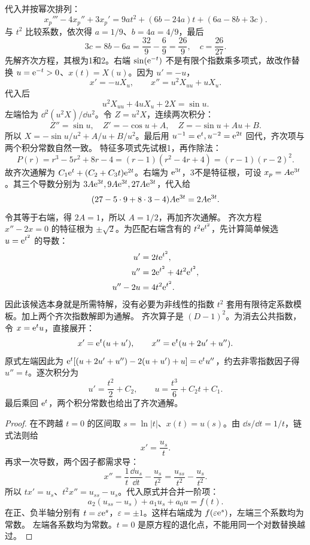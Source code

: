 代入并按幂次排列：
\[
x_p'''-4x_p''+3x_p'
=9at^2+(6b-24a)t+(6a-8b+3c).
\]
与 $t^2$ 比较系数，依次得 $a=1/9$、$b=4a=4/9$，最后
\[
3c=8b-6a=\dfrac{32}{9}-\dfrac{6}{9}=\dfrac{26}{9},
\quad c=\dfrac{26}{27}.
\]
先解齐次方程，其根为1和2。右端 $\sin(\mathrm e^{-t})$ 不是有限个指数乘多项式，故改作替换 $u=\mathrm e^{-t}>0$、$x(t)=X(u)$。因为 $u'=-u$，
\[
x'=-uX_u,\qquad x''=u^2X_{uu}+uX_u.
\]
代入后
\[
u^2X_{uu}+4uX_u+2X=\sin u.
\]
左端恰为 $\dd^2(u^2X)/\dd u^2$。令 $Z=u^2X$，连续两次积分：
\[
Z''=\sin u,\quad Z'=-\cos u+A,\quad Z=-\sin u+Au+B.
\]
所以 $X=-\sin u/u^2+A/u+B/u^2$。最后用 $u^{-1}=\mathrm e^t,u^{-2}=\mathrm e^{2t}$ 回代，齐次项与两个积分常数自然一致。
特征多项式先试根1，再作除法：
\[
P(r)=r^3-5r^2+8r-4=(r-1)(r^2-4r+4)=(r-1)(r-2)^2.
\]
故齐次通解为 $C_1\mathrm e^t+(C_2+C_3t)\mathrm e^{2t}$。右端为 $\mathrm e^{3t}$，3不是特征根，可设 $x_p=A\mathrm e^{3t}$。其三个导数分别为 $3A\mathrm e^{3t},9A\mathrm e^{3t},27A\mathrm e^{3t}$，代入给
\[
(27-5\cdot9+8\cdot3-4)A\mathrm e^{3t}=2A\mathrm e^{3t}.
\]
令其等于右端，得 $2A=1$，所以 $A=1/2$，再加齐次通解。
齐次方程 $x''-2x=0$ 的特征根为 $\pm\sqrt2$。为匹配右端含有的 $t^2\mathrm e^{t^2}$，先计算简单候选 $u=\mathrm e^{t^2}$ 的导数：
\[
\begin{aligned}
u'&=2t\mathrm e^{t^2},\\
u''&=2\mathrm e^{t^2}+4t^2\mathrm e^{t^2},\\
u''-2u&=4t^2\mathrm e^{t^2}.
\end{aligned}
\]
因此该候选本身就是所需特解，没有必要为非线性的指数 $t^2$ 套用有限待定系数模板。加上两个齐次指数解即为通解。
齐次算子是 $(D-1)^2$。为消去公共指数，令 $x=\mathrm e^tu$，直接展开：
\[
x'=\mathrm e^t(u+u'),\qquad x''=\mathrm e^t(u+2u'+u'').
\]
原式左端因此为 $\mathrm e^t[(u+2u'+u'')-2(u+u')+u]=\mathrm e^tu''$，约去非零指数因子得 $u''=t$。逐次积分为
\[
u'=\dfrac{t^2}{2}+C_2,\qquad
u=\dfrac{t^3}{6}+C_2t+C_1.
\]
最后乘回 $\mathrm e^t$，两个积分常数也给出了齐次通解。
\begin{proof}
在不跨越 $t=0$ 的区间取 $s=\ln|t|$、$x(t)=u(s)$。由 $\dd s/\dd t=1/t$，链式法则给
\[
x'=\dfrac{u_s}{t}.
\]
再求一次导数，两个因子都需求导：
\[
x''=\dfrac1t\dfrac{\dd u_s}{\dd t}-\dfrac{u_s}{t^2}
=\dfrac{u_{ss}}{t^2}-\dfrac{u_s}{t^2}.
\]
所以 $tx'=u_s$、$t^2x''=u_{ss}-u_s$。代入原式并合并一阶项：
\[
a_2(u_{ss}-u_s)+a_1u_s+a_0u=f(t).
\]
在正、负半轴分别有 $t=\varepsilon\mathrm e^s$，$\varepsilon=\pm1$。这样右端成为 $f(\varepsilon\mathrm e^s)$，左端三个系数均为常数。
左端各系数均为常数。$t=0$ 是原方程的退化点，不能用同一个对数替换越过。
\end{proof}
